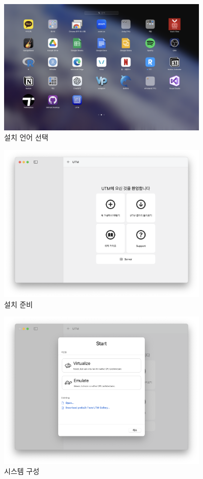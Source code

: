 \begin{figure}[htbp]
    \centering
    \includegraphics[width=0.9\textwidth]{images/chapter2Images/ch2_image_02.png}
    \caption{설치 언어 선택}
\end{figure}

\begin{figure}[htbp]
    \centering
    \includegraphics[width=0.9\textwidth]{images/chapter2Images/ch2_image_03.png}
    \caption{설치 준비}
\end{figure}

\begin{figure}[htbp]
    \centering
    \includegraphics[width=0.9\textwidth]{images/chapter2Images/ch2_image_04.png}
    \caption{시스템 구성}
\end{figure}

